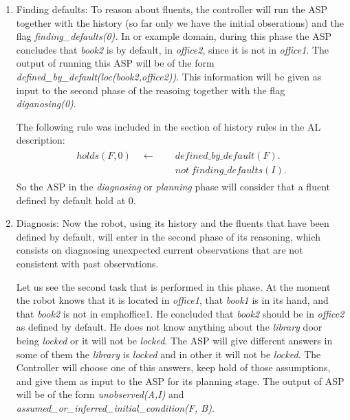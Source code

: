 \documentclass[11pt, oneside]{article}
\begin{document}
\begin{enumerate}
\item Finding defaults:
To reason about fluents, the controller will run the ASP together with the history (so far only we have the initial obserations) and the flag \emph{finding\_defaults(0).} In or example domain, during this phase the ASP concludes that \emph{book2} is by default, in \emph{office2}, since it is not in \emph{office1}. The output of running this ASP will be of the form \emph{defined\_by\_default(loc(book2,office2))}. This information will be given as input to the second phase of the reasoing together with the flag \emph{diganosing(0)}.

The following rule was included in the section of history rules in the AL description:
\begin{align}\begin{split}
holds(F, 0)  \quad \leftarrow \quad\ &defined\_by\_default(F). \\
&not\ finding\_defaults(I).
\end{split}\end{align}
So the ASP in the \emph{diagnosing} or \emph{planning} phase will consider that a fluent defined by default hold at 0. 

\item Diagnosis: 
Now the robot, using its history and the fluents that have been defined by default, will enter in the second phase of its reasoning, which consists on diagnosing unexpected current observations that are not consistent with past observations. 
 

Let us see the second task that is performed in this phase. At the moment the robot knows that it is located in \emph{office1}, that \emph{book1} is in its hand, and that \emph{book2} is not in emph{office1}. He concluded that \emph{book2} should be in \emph{office2} as defined by default. He does not know anything about the \emph{library} door being \emph{locked} or it will not be \emph{locked}. The ASP will give different answers in some of them the \emph{library} is \emph{locked} and in other it will not be \emph{locked}. The Controller will choose one of this answers, keep hold of those assumptions, and give them as input to the ASP for its planning stage. The output of ASP will be of the form \emph{unobserved(A,I)} and \emph{assumed\_or\_inferred\_initial\_condition(F, B)}.


\end{enumerate}
\end{document}
